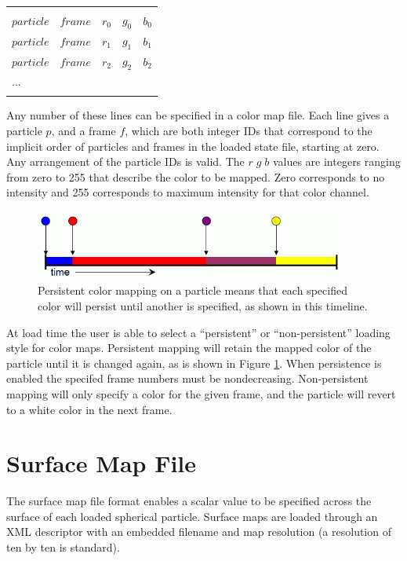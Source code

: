 \begin{tabular}{lllll}
	& & & & \\
	$particle$ & $frame$ & $r_0$ & $g_0$ & $b_0$ \\
	$particle$ & $frame$ & $r_1$ & $g_1$ & $b_1$ \\
	$particle$ & $frame$ & $r_2$ & $g_2$ & $b_2$ \\
	... & & & & \\
	& & & & \\
\end{tabular}

Any number of these lines can be specified in a color map file.  Each line gives a particle $p$, and a frame $f$, which are both integer IDs that correspond to the implicit order of particles and frames in the loaded state file, starting at zero.  Any arrangement of the particle IDs is valid.  The $r \; g \; b$ values are integers ranging from zero to 255 that describe the color to be mapped.  Zero corresponds to no intensity and 255 corresponds to maximum intensity for that color channel.

\begin{figure}[htb]
\centering
\includegraphics[width=4.0in]{pics/timeline.png}
\caption[Persistent color mapping on a particle]{Persistent color mapping on a particle means that each specified color will persist until another is specified, as shown in this timeline.}
\label{map-timeline}
\end{figure}

At load time the user is able to select a ``persistent'' or ``non-persistent'' loading style for color maps.  Persistent mapping will retain the mapped color of the particle until it is changed again, as is shown in Figure \ref{map-timeline}.  When persistence is enabled the specifed frame numbers must be nondecreasing.  Non-persistent mapping will only specify a color for the given frame, and the particle will revert to a white color in the next frame.

\section{Surface Map File}
\label{SurfaceMaps}

The surface map file format enables a scalar value to be specified across the surface of each loaded spherical particle.  Surface maps are loaded through an XML descriptor with an embedded filename and map resolution (a resolution of ten by ten is standard).

